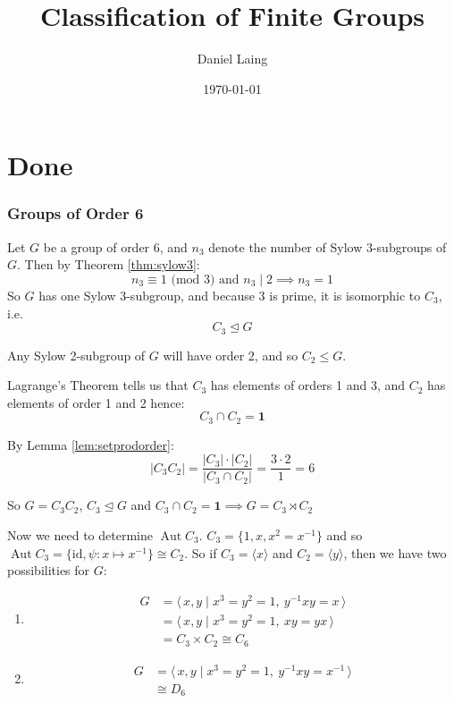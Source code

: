\documentclass[a4paper, oneside, 12pt, final]{article}
\title{Classification of Finite Groups}
\author{Daniel Laing}
\date{\today}
\theoremstyle{definition}
\DeclareMathOperator{\Aut}{Aut}
\begin{document}
{\maketitle}
{\tableofcontents}

\part{Done}


\section{Groups of Order 6}
Let \(G\) be a group of order 6, and \(n_3\) denote the number of Sylow
3-subgroups of \(G\).
Then by Theorem \ref{thm:sylow3}:
\[n_3 \equiv 1 \text{ (mod 3) and } n_3 \mid 2 \implies n_3 = 1\]
So \(G\) has one Sylow 3-subgroup, and because 3 is prime, it is isomorphic to
\(C_3\), i.e.
\[C_3 \unlhd G\]

Any Sylow 2-subgroup of \(G\) will have order 2, and so \(C_2 \leqslant G\).

Lagrange's Theorem tells us that \(C_3\) has elements of orders 1 and 3, and
\(C_2\) has elements of order 1 and 2 hence:
\[C_3 \cap C_2 = \bm{1}\]

By Lemma \ref{lem:setprodorder}:
\[|C_3 C_2| = \frac{|C_3| \cdot |C_2|}{|C_3 \cap C_2|} = \frac{3 \cdot 2}{1} =
6\]

So \(G = C_3 C_2\), \(C_3 \unlhd G\) and \(C_3 \cap C_2 = \bm{1} \implies G =
C_3 \rtimes C_2\)

Now we need to determine \(\Aut{C_3}\).
\(C_3 = \{1, x, x^2 = x^{-1}\}\) and so \(\Aut{C_3} = \{\text{id}, \psi:x
\mapsto x^{-1}\} \cong C_2\).
So if \(C_3 = \langle x \rangle\) and \(C_2 = \langle y \rangle\), then we have
two possibilities for \(G\):
\begin{enumerate}
    \item
        \begin{equation*}
        \begin{aligned}
            G &= \langle\, x, y \mid x^3 = y^2 = 1,\ y^{-1}xy = x \,\rangle \\
            &=\langle\, x, y \mid x^3 = y^2 = 1,\ xy = yx \,\rangle \\
            &= C_3 \times C_2 \cong C_6
        \end{aligned}
        \end{equation*}
    \item
        \begin{equation*}
        \begin{aligned}
            G &= \langle\, x, y \mid x^3 = y^2 = 1,\ y^{-1}xy = x^{-1}
            \,\rangle \\
            &\cong D_6
        \end{aligned}
        \end{equation*}
\end{enumerate}
\end{document}
